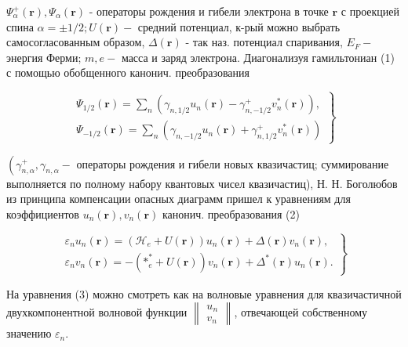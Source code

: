 \documentclass[10pt]{article}
\begin{document}
$\Psi_{\alpha}^{+}(\boldsymbol{r}), \Psi_{\alpha}(\boldsymbol{r})$ - операторы рождения и гибели электрона в точке $\boldsymbol{r}$ с проекцией спина $\alpha= \pm 1 / 2 ; U(\boldsymbol{r})-$ средний потенциал, к-рый можно выбрать самосогласованным образом, $\Delta(\boldsymbol{r})$ - так наз. потенциал спаривания, $E_{F}-$ энергия Ферми; $m, e-$ масса и заряд электрона. Диагонализуя гамильтониан (1) с помощью обобщенного канонич. преобразования



\[

\left.\begin{array}{l}

\Psi_{1 / 2}(\boldsymbol{r})=\sum_{n}\left(\gamma_{n, 1 / 2} u_{n}(\boldsymbol{r})-\gamma_{n,-1 / 2}^{+} v_{n}^{*}(\boldsymbol{r})\right), \\

\Psi_{-1 / 2}(\boldsymbol{r})=\sum_{n}\left(\gamma_{n,-1 / 2} u_{n}(\boldsymbol{r})+\gamma_{n, 1 / 2}^{+} v_{n}^{*}(\boldsymbol{r})\right)

\end{array}\right\}

\]



$\left(\gamma_{n, \alpha}^{+}, \gamma_{n, \alpha}-\right.$ операторы рождения и гибели новых квазичастиц; суммирование выполняется по полному набору квантовых чисел квазичастиц), Н. Н. Боголюбов из принципа компенсации опасных диаграмм пришел к уравнениям для коэффициентов $u_{n}(\boldsymbol{r}), v_{n}(\boldsymbol{r})$ канонич. преобразования (2)



\[

\left.\begin{array}{l}

\varepsilon_{n} u_{n}(\boldsymbol{r})=\left(\mathscr{H}_{e}+U(\boldsymbol{r})\right) u_{n}(\boldsymbol{r})+\Delta(\boldsymbol{r}) v_{n}(\boldsymbol{r}), \\

\varepsilon_{n} v_{n}(\boldsymbol{r})=-\left(\mathscr{*}_{e}^{*}+U(\boldsymbol{r})\right) v_{n}(\boldsymbol{r})+\Delta^{*}(\boldsymbol{r}) u_{n}(\boldsymbol{r}) .

\end{array}\right\}

\]



На уравнения (3) можно смотреть как на волновые уравнения для квазичастичной двухкомпонентной волновой функции $\left\|\begin{array}{l}u_{n} \\ v_{n}\end{array}\right\|$, отвечающей собственному значению $\varepsilon_{n}$.
\end{document}
